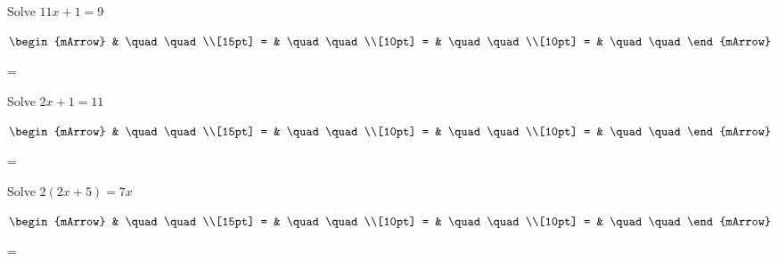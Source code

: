 \begin{mtask}[resume]
   \task \begin{exercise} Solve $ 11x +1  = 9 $
           \begin{envSolution}
             $\begin{mArrow} 
			       & \quad \quad              \\[15pt]
                 = & \quad \quad              \\[10pt]
		   		 = & \quad \quad              \\[10pt]
				 = & \quad \quad 
              \end{mArrow}$
            \begin{shortsolution}  
			     =$ \quad \quad \quad \quad$
			\end{shortsolution}				 
           \end{envSolution}
         \end{exercise}
   \task \begin{exercise} Solve $2x + 1 = 11 $
           \begin{envSolution}
             $\begin{mArrow} 
			       & \quad \quad              \\[15pt]
                 = & \quad \quad              \\[10pt]
		   		 = & \quad \quad              \\[10pt]
				 = & \quad \quad 
              \end{mArrow}$
            \begin{shortsolution}  
			     =$ \quad \quad \quad \quad$
			\end{shortsolution}				 
           \end{envSolution}
         \end{exercise}
   \task \begin{exercise} Solve $2(2x+5) = 7x $
           \begin{envSolution}
             $\begin{mArrow} 
			       & \quad \quad              \\[15pt]
                 = & \quad \quad              \\[10pt]
		   		 = & \quad \quad              \\[10pt]
				 = & \quad \quad 
              \end{mArrow}$
            \begin{shortsolution}  
			     =$ \quad \quad \quad \quad$
			\end{shortsolution}				 

\end{envSolution}
\end{exercise}
\end{mtask}
